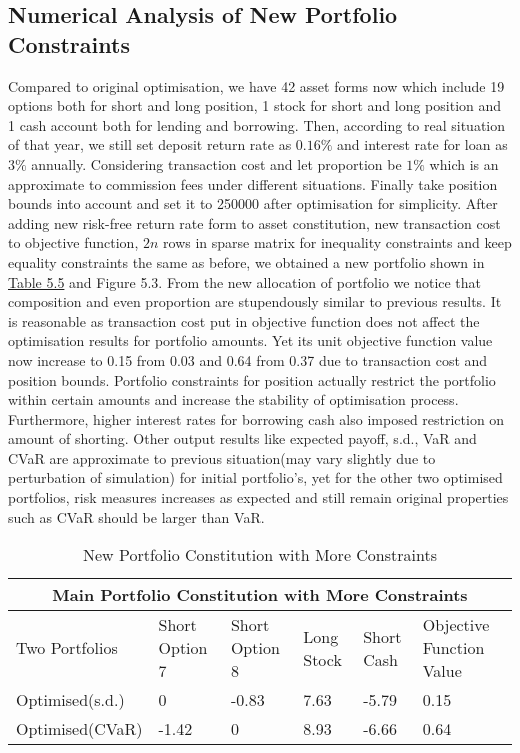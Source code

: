 \subsection{Numerical Analysis of New Portfolio Constraints}
Compared to original optimisation, we have 42 asset forms now which include 19 options both for short and long position, 1 stock for short and long position and 1 cash account both for lending and borrowing. Then, according to real situation of that year, we still set deposit return rate as $0.16\%$ and interest rate for loan as $3\%$ annually. Considering transaction cost and let proportion be $1\%$ which is an approximate to commission fees under different situations. Finally take position bounds into account and set it to 250000 after optimisation for simplicity. After adding new risk-free return rate form to asset constitution, new transaction cost to objective function, $2n$ rows in sparse matrix for inequality constraints and keep equality constraints the same as before, we obtained a new portfolio shown in \hyperref[Table 5.5]{Table 5.5} and Figure 5.3. From the new allocation of portfolio we notice that composition and even proportion are stupendously similar to previous results. It is reasonable as transaction cost put in objective function does not affect the optimisation results for portfolio amounts. Yet its unit objective function value now increase to 0.15 from 0.03 and 0.64 from 0.37 due to transaction cost and position bounds. Portfolio constraints for position actually restrict the portfolio within certain amounts and increase the stability of optimisation process. Furthermore, higher interest rates for borrowing cash also imposed restriction on amount of shorting. Other output results like expected payoff, s.d., VaR and CVaR are approximate to previous situation(may vary slightly due to perturbation of simulation) for initial portfolio's, yet for the other two optimised portfolios, risk measures increases as expected and still remain original properties such as CVaR should be larger than VaR. 
\begin{table}[t!]\label{Table 5.5}
\centering
\caption{New Portfolio Constitution with More Constraints}
\begin{tabular}{ |p{3.2cm}||p{1.4cm}|p{1.4cm}|p{1.4cm}|p{1.4cm}|p{1.8cm}| }
 \hline
 \multicolumn{6}{|c|}{Main Portfolio Constitution with More Constraints} \\
 \hline
Two Portfolios&Short Option 7&Short Option 8&Long Stock&Short Cash&Objective Function Value\\
 \hline
Optimised(s.d.)& 0 &-0.83&7.63&-5.79&0.15\\
Optimised(CVaR)&-1.42&0&8.93&-6.66&0.64\\
 \hline
\end{tabular}
\end{table}
